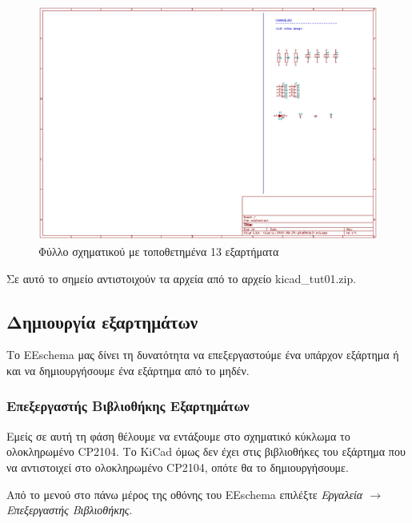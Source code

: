 \documentclass[a4paper]{article}
\begin{document}
\begin{figure}
  \begin{center}
    \includegraphics[width=.9\textwidth]{img/eesch-circ-placedccompcop.png}
    \caption{Φύλλο σχηματικού με τοποθετημένα 13 εξαρτήματα}
    \label{fig:eesch-circ-placedccompcop}
  \end{center}
\end{figure}

Σε αυτό το σημείο αντιστοιχούν τα αρχεία από το αρχείο kicad\_tut01.zip.

\subsection{Δημιουργία εξαρτημάτων}
Το \textenglish{EEschema} μας δίνει τη δυνατότητα να επεξεργαστούμε ένα υπάρχον εξάρτημα ή και να δημιουργήσουμε ένα εξάρτημα από το μηδέν.

\subsubsection{Επεξεργαστής Βιβλιοθήκης Εξαρτημάτων}

Εμείς σε αυτή τη φάση θέλουμε να εντάξουμε στο σχηματικό κύκλωμα το ολοκληρωμένο CP2104. Το \textenglish{KiCad} όμως δεν έχει στις βιβλιοθήκες του εξάρτημα που να αντιστοιχεί στο ολοκληρωμένο CP2104, οπότε θα το δημιουργήσουμε.

Από το μενού στο πάνω μέρος της οθόνης του \textenglish{EEschema} επιλέξτε \textit{Εργαλεία $\rightarrow$ Επεξεργαστής Βιβλιοθήκης}.
\end{document}
